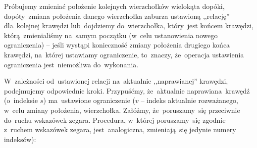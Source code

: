 \documentclass[11pt, a4paper]{article}
\begin{document}
 Próbujemy zmieniać położenie kolejnych wierzchołków wielokąta dopóki, dopóty~zmiana położenia danego wierzchołka
 zaburza ustawioną ,,relację'' dla~kolejnej krawędzi lub~dojdziemy do~wierzchołka, który~jest końcem krawędzi,
 którą~zmienialiśmy na~samym początku (w~celu ustanowienia nowego ograniczenia) -- jeśli wystąpi konieczność zmiany
 położenia drugiego końca krawędzi, na~której ustawiamy ograniczenie, to~znaczy, że~operacja ustawienia ograniczenia jest~niemożliwa do~wykonania.
 
 W~zależności od~ustawionej relacji na~aktualnie ,,naprawianej'' krawędzi, podejmujemy odpowiednie kroki.
 Przypuśćmy, że~aktualnie naprawiana~krawędź (o~indeksie $s$) ma~ustawione ograniczenie ($v$ -- indeks aktualnie rozważanego, w~celu zmiany
 położenia, wierzchołka. Załóżmy, że~poruszamy~się przeciwnie do~ruchu wskazówek zegara. Procedura, w~której poruszamy~się
 zgodnie z~ruchem wskazówek zegara, jest~analogiczna, zmieniają~się jedynie numery indeksów):
\end{document}
